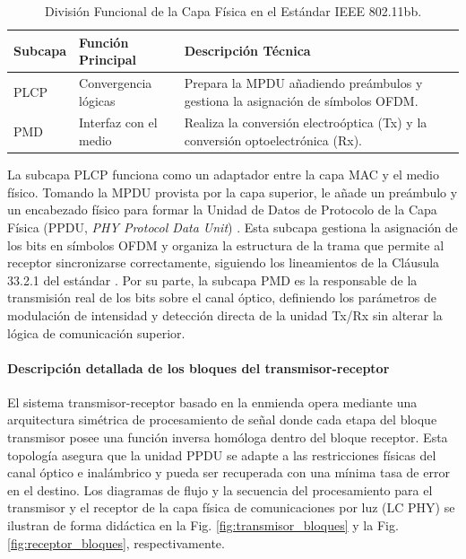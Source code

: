 \begin{table}[htbp]
	\centering
	\caption{División Funcional de la Capa Física en el Estándar IEEE 802.11bb.}
	\label{tab:capa_fisica_div}
	\begin{tabular}{|p{3.5cm}|p{4.5cm}|p{6.5cm}|}
		\hline
		\textbf{Subcapa} & \textbf{Función Principal} & \textbf{Descripción Técnica} \\ \hline
		PLCP & Convergencia lógicas & Prepara la MPDU añadiendo preámbulos y gestiona la asignación de símbolos OFDM. \\ \hline
		PMD & Interfaz con el medio & Realiza la conversión electroóptica (Tx) y la conversión optoelectrónica (Rx). \\ \hline
	\end{tabular}
\end{table}

La subcapa PLCP funciona como un adaptador entre la capa MAC y el medio físico. Tomando la MPDU provista por la capa superior, le añade un preámbulo y un encabezado físico para formar la Unidad de Datos de Protocolo de la Capa Física (PPDU, \textit{PHY Protocol Data Unit}) \cite{kim2022ieee}. Esta subcapa gestiona la asignación de los bits en símbolos OFDM y organiza la estructura de la trama que permite al receptor sincronizarse correctamente, siguiendo los lineamientos de la Cláusula 33.2.1 del estándar \cite{ieee80211bb2023}. Por su parte, la subcapa PMD es la responsable de la transmisión real de los bits sobre el canal óptico, definiendo los parámetros de modulación de intensidad y detección directa de la unidad Tx/Rx sin alterar la lógica de comunicación superior.

\paragraph{Descripción detallada de los bloques del transmisor-receptor}
El sistema transmisor-receptor basado en la enmienda \cite{ieee80211bb2023} opera mediante una arquitectura simétrica de procesamiento de señal donde cada etapa del bloque transmisor posee una función inversa homóloga dentro del bloque receptor. Esta topología asegura que la unidad PPDU se adapte a las restricciones físicas del canal óptico e inalámbrico y pueda ser recuperada con una mínima tasa de error en el destino. Los diagramas de flujo y la secuencia del procesamiento para el transmisor y el receptor de la capa física de comunicaciones por luz (LC PHY) se ilustran de forma didáctica en la Fig. \ref{fig:transmisor_bloques} y la Fig. \ref{fig:receptor_bloques}, respectivamente.

